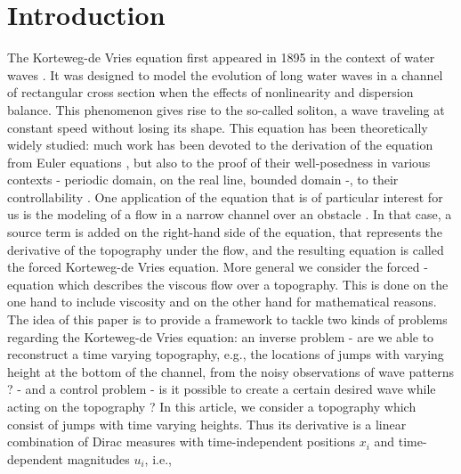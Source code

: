 
\section{Introduction}

The Korteweg-de Vries equation first appeared in 1895 in the context of water waves \cite{korteweg1895xli}. It was designed to model the evolution of long water waves in a channel of rectangular cross section when the effects of nonlinearity and dispersion balance. This phenomenon gives rise to the so-called soliton, a wave traveling at constant speed without losing its shape. This equation has been theoretically widely studied: much work has been devoted to the derivation of the equation from Euler equations \cite{shen1992forced,constantin2008,su2003korteweg}, but also to the proof of their well-posedness in various contexts \cite{miura1976korteweg,kenig1993,bourgain1997periodic} - periodic domain, on the real line, bounded domain -, to their controllability \cite{rosier1997exact,glass2008some,coron2003exact,chapouly2009global}.
One application of the \KdV equation that is of particular interest for us is the modeling of a flow in a narrow channel over an obstacle \cite{milewski2004forced,shen1992forced,shen1996accuracy}. %
In that case, a source term is added on the right-hand side of the \KdV equation, that represents the derivative of the topography under the flow, and the resulting equation is called the forced Korteweg-de Vries equation. More general we consider the forced \KdVB-equation which describes the viscous flow over a topography. This is done on the one hand to include viscosity and on the other hand for mathematical reasons.      %
The idea of this paper is to provide a framework to tackle two kinds of problems regarding the Korteweg-de Vries equation: an inverse problem - are we able to reconstruct a time varying topography, e.g., the locations of jumps with varying height at the bottom of the channel, from the noisy observations of wave patterns ? -  and a control problem - is it possible to create a certain desired wave while acting on the topography ? In this article, we consider a topography which consist of jumps with time varying heights. Thus its derivative is a linear combination of Dirac measures with time-independent positions $x_i$ and time-dependent magnitudes $u_i$, i.e.,
